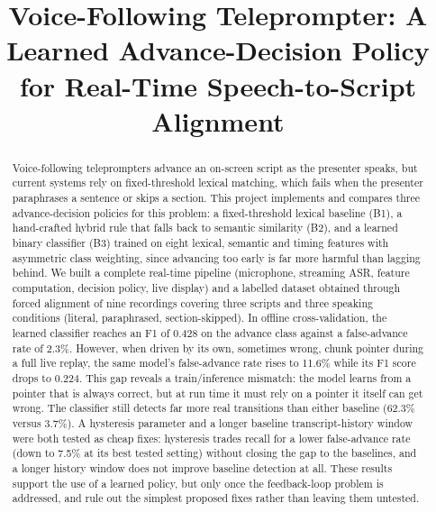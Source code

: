 \documentclass[conference,a4paper]{IEEEtran}
\begin{document}
\title{Voice-Following Teleprompter: A Learned Advance-Decision Policy for Real-Time Speech-to-Script Alignment}

\author{
}

\maketitle

\begin{abstract}
Voice-following teleprompters advance an on-screen script as the presenter speaks, but current systems rely on fixed-threshold lexical matching, which fails when the presenter paraphrases a sentence or skips a section. This project implements and compares three advance-decision policies for this problem: a fixed-threshold lexical baseline (B1), a hand-crafted hybrid rule that falls back to semantic similarity (B2), and a learned binary classifier (B3) trained on eight lexical, semantic and timing features with asymmetric class weighting, since advancing too early is far more harmful than lagging behind. We built a complete real-time pipeline (microphone, streaming ASR, feature computation, decision policy, live display) and a labelled dataset obtained through forced alignment of nine recordings covering three scripts and three speaking conditions (literal, paraphrased, section-skipped). In offline cross-validation, the learned classifier reaches an F1 of 0.428 on the advance class against a false-advance rate of 2.3\%. However, when driven by its own, sometimes wrong, chunk pointer during a full live replay, the same model's false-advance rate rises to 11.6\% while its F1 score drops to 0.224. This gap reveals a train/inference mismatch: the model learns from a pointer that is always correct, but at run time it must rely on a pointer it itself can get wrong. The classifier still detects far more real transitions than either baseline (62.3\% versus 3.7\%). A hysteresis parameter and a longer baseline transcript-history window were both tested as cheap fixes: hysteresis trades recall for a lower false-advance rate (down to 7.5\% at its best tested setting) without closing the gap to the baselines, and a longer history window does not improve baseline detection at all. These results support the use of a learned policy, but only once the feedback-loop problem is addressed, and rule out the simplest proposed fixes rather than leaving them untested.
\end{abstract}
\end{document}
